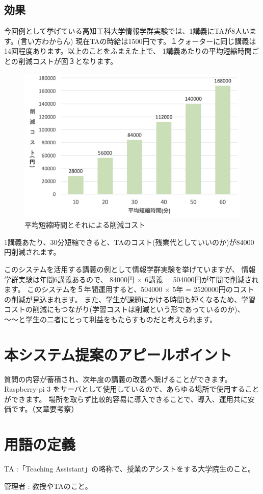 \documentclass[a4j,titlepage]{ujarticle}
\begin{document}
\subsection{効果}
今回例として挙げている高知工科大学情報学群実験では、1講義にTAが8人います。(言い方わからん)
現在TAの時給は1500円です。１クォーターに同じ講義は14回程度あります。以上のことをふまえた上で、
1講義あたりの平均短縮時間ごとの削減コストが図３となります。
\begin{figure}[h]

\centering
   \includegraphics[width=13cm]{sisan.png}
  \caption{平均短縮時間とそれによる削減コスト}
\end{figure}

1講義あたり、30分短縮できると、TAのコスト(残業代としていいのか)が84000円削減されます。


このシステムを活用する講義の例として情報学群実験を挙げていますが、
情報学群実験は年間6講義あるので、 84000円 × 6講義 = 504000円が年間で削減されます。
このシステムを５年間運用すると、504000 × 5年 = 2520000円のコストの削減が見込まれます。
また、学生が課題にかける時間も短くなるため、学習コストの削減にもつながり(学習コストは削減という形であっているのか)、
〜〜と学生の二者にとって利益をもたらすものだと考えられます。

\section{本システム提案のアピールポイント}
質問の内容が蓄積され、次年度の講義の改善へ繋げることができます。
Raspberry-pi 3 をサーバとして使用しているので、あらゆる場所で使用することができます。
場所を取らず比較的容易に導入できることで、導入、運用共に安価です。（文章要考察）


\section{用語の定義}
TA :「Teaching Assistant」の略称で、授業のアシストをする大学院生のこと。

管理者 : 教授やTAのこと。




\newpage
\end{document}
